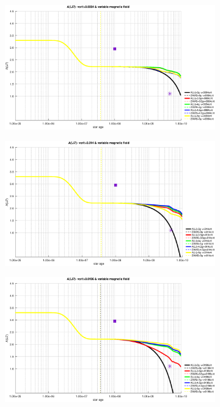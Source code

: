 \documentclass[fleqn,usenatbib]{mnras}
\begin{document}
\begin{figure}
    \centering
    \begin{subfigure}[h]{0.47\textwidth}
    \includegraphics[width=\textwidth]{figures/li_vc_0084_var_b.eps}
    \label{fig:subim21}
    \end{subfigure}
    \begin{subfigure}[h]{0.47\textwidth}
    \includegraphics[width=\textwidth]{figures/li_vc_014_var_b.eps}
    \label{fig:subim22}
    \end{subfigure}
    \begin{subfigure}[h]{0.47\textwidth}
    \includegraphics[width=\textwidth]{figures/li_vc_0196_var_b.eps}

\end{subfigure}
\end{figure}
\end{document}

